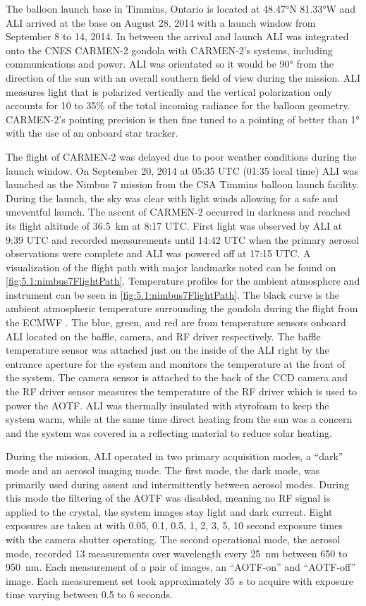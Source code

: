 \documentclass[12pt]{article}
\begin{document}
The balloon launch base in Timmins, Ontario is located at 48.47\si{\degree}N 81.33\si{\degree}W and ALI arrived at the base on August 28, 2014 with a launch window from September 8 to 14, 2014. In between the arrival and launch ALI was integrated onto the CNES CARMEN-2 gondola with CARMEN-2's systems, including communications and power. ALI was orientated so it would be 90\si{\degree} from the direction of the sun with an overall southern field of view during the mission. ALI measures light that is polarized vertically and the vertical polarization only accounts for 10 to 35\% of the total incoming radiance for the balloon geometry. CARMEN-2's pointing precision is then fine tuned to a pointing of better than 1\si{\degree} with the use of an onboard star tracker.

The flight of CARMEN-2 was delayed due to poor weather conditions during the launch window. On September 20, 2014 at 05:35 UTC (01:35 local time) ALI was launched as the Nimbus 7 mission from the CSA Timmins balloon launch facility. During the launch, the sky was clear with light winds allowing for a safe and uneventful launch. The ascent of CARMEN-2 occurred in darkness and reached its flight altitude of 36.5~km at 8:17 UTC. First light was observed by ALI at 9:39 UTC and recorded measurements until 14:42 UTC when the primary aerosol observations were complete and ALI was powered off at 17:15 UTC. A visualization of the flight path with major landmarks noted can be found on \autoref{fig:5.1:nimbus7FlightPath}. Temperature profiles for the ambient atmosphere and instrument can be seen in \autoref{fig:5.1:nimbus7FlightPath}. The black curve is the ambient atmospheric temperature surrounding the gondola during the flight from the ECMWF \citep{Molteni1996}. The blue, green, and red are from temperature sensors onboard ALI located on the baffle, camera, and RF driver respectively. The baffle temperature sensor was attached just on the inside of the ALI right by the entrance aperture for the system and monitors the temperature at the front of the system. The camera sensor is attached to the back of the CCD camera and the RF driver sensor measures the temperature of the RF driver which is used to power the AOTF. ALI was thermally insulated with styrofoam to keep the system warm, while at the same time direct heating from the sun was a concern and the system was covered in a reflecting material to reduce solar heating.

During the mission, ALI operated in two primary acquisition modes, a ``dark'' mode and an aerosol imaging mode. The first mode, the dark mode, was primarily used during assent and intermittently between aerosol modes. During this mode the filtering of the AOTF was disabled, meaning no RF signal is applied to the crystal, the system images stay light and dark current. Eight exposures are taken at with 0.05, 0.1, 0.5, 1, 2, 3, 5, 10 second exposure times with the camera shutter operating. The second operational mode, the aerosol mode, recorded 13 measurements over wavelength every 25~nm between 650 to 950~nm. Each measurement of a pair of images, an ``AOTF-on'' and ``AOTF-off'' image. Each measurement set took approximately 35~s to acquire with exposure time varying between 0.5 to 6 seconds.
\end{document}
